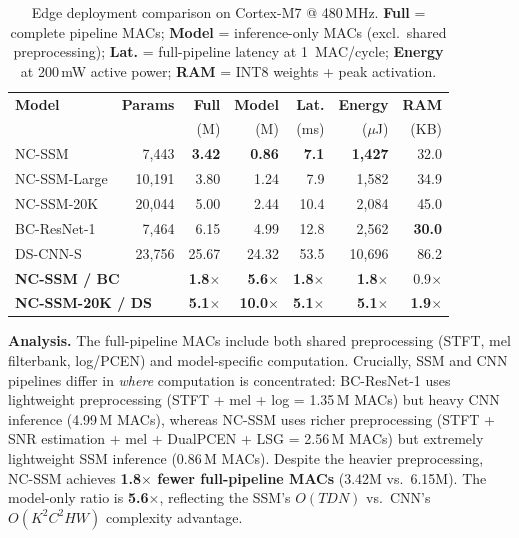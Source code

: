 \documentclass[journal]{IEEEtran}
\begin{document}
\begin{table}[t]
\centering
\caption{Edge deployment comparison on Cortex-M7 @ 480\,MHz. \textbf{Full} = complete pipeline MACs; \textbf{Model} = inference-only MACs (excl.\ shared preprocessing); \textbf{Lat.} = full-pipeline latency at 1~MAC/cycle; \textbf{Energy} at 200\,mW active power; \textbf{RAM} = INT8 weights + peak activation.}
\label{tab:mcu_deploy}
\small
\setlength{\tabcolsep}{2.8pt}
\begin{tabular}{lrrrrrr}
\toprule
\textbf{Model} & \textbf{Params} & \textbf{Full} & \textbf{Model} & \textbf{Lat.} & \textbf{Energy} & \textbf{RAM} \\
               &                & (M)          & (M)           & (ms)         & ($\mu$J)       & (KB)        \\
\midrule
NC-SSM         & 7{,}443  & \textbf{3.42} & \textbf{0.86} & \textbf{7.1}  & \textbf{1{,}427}   & 32.0  \\
NC-SSM-Large   & 10{,}191 & 3.80 & 1.24 & 7.9  & 1{,}582   & 34.9  \\
NC-SSM-20K     & 20{,}044 & 5.00 & 2.44 & 10.4 & 2{,}084   & 45.0  \\
\midrule
BC-ResNet-1    & 7{,}464  & 6.15 & 4.99 & 12.8 & 2{,}562 & \textbf{30.0} \\
DS-CNN-S       & 23{,}756 & 25.67 & 24.32 & 53.5 & 10{,}696 & 86.2 \\
\midrule
\multicolumn{2}{l}{\textbf{NC-SSM / BC}} & \textbf{1.8$\times$} & \textbf{5.6$\times$} & \textbf{1.8$\times$} & \textbf{1.8$\times$} & 0.9$\times$ \\
\multicolumn{2}{l}{\textbf{NC-SSM-20K / DS}} & \textbf{5.1$\times$} & \textbf{10.0$\times$} & \textbf{5.1$\times$} & \textbf{5.1$\times$} & \textbf{1.9$\times$} \\
\bottomrule
\end{tabular}
\end{table}

\smallskip\noindent\textbf{Analysis.}
The full-pipeline MACs include both shared preprocessing (STFT, mel filterbank, log/PCEN) and model-specific computation.
Crucially, SSM and CNN pipelines differ in \emph{where} computation is concentrated:
BC-ResNet-1 uses lightweight preprocessing (STFT + mel + log = 1.35\,M MACs) but heavy CNN inference (4.99\,M MACs),
whereas NC-SSM uses richer preprocessing (STFT + SNR estimation + mel + DualPCEN + LSG = 2.56\,M MACs) but extremely lightweight SSM inference (0.86\,M MACs).
Despite the heavier preprocessing, NC-SSM achieves \textbf{1.8$\times$ fewer full-pipeline MACs} (3.42M vs.\ 6.15M).
The model-only ratio is \textbf{5.6$\times$}, reflecting the SSM's $O(TDN)$ vs.\ CNN's $O(K^2C^2HW)$ complexity advantage.
\end{document}
